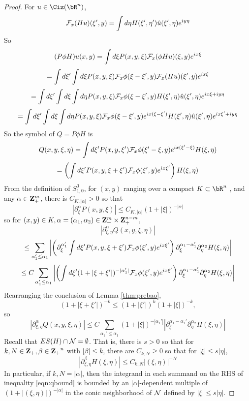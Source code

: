 \begin{proof}
  For $u \in \Ciz(\bR^n)$,
  \[
    {\cal F}_x(Hu)(\xi',y) = \int  d\eta H(\xi',\eta')\hat{u}(\xi',\eta)e^{ i y \eta}
  \]
  So
  \[
    (P\phi H)u(x,y) = \int d \xi P(x,y,\xi) {\cal F}_x(\phi Hu)(\xi,y)e^{i x\xi}
  \]
  \[
    =\int d \xi' \int d \xi P(x,y,\xi) {\cal F}_x\phi(\xi-\xi',y) {\cal F}_x(Hu)(\xi',y)e^{i x\xi}
  \]
  \[
   =\int d \xi' \int d \xi \int d\eta P(x,y,\xi) {\cal F}_x\phi(\xi-\xi',y) H(\xi',\eta)\hat{u}(\xi',\eta)e^{i x\xi + i y\eta }
  \]
  \[
    =\int d \xi' \int d \xi \int d\eta P(x,y,\xi) {\cal F}_x\phi(\xi-\xi',y) e^{ix(\xi-\xi')}H(\xi',\eta)\hat{u}(\xi',\eta)e^{i x\xi' + i y\eta }
  \]
  So the symbol of $Q = P \phi H$ is
  \[
    Q(x,y,\xi,\eta) = \int d\xi' P(x,y,\xi') {\cal F}_x\phi(\xi'-\xi,y) e^{i x(\xi'-\xi)}H(\xi,\eta)
  \]
  \[
    = \left(\int d\xi' P(x,y,\xi+\xi') {\cal F}_x\phi(\xi',y) e^{i x\xi'}\right) H(\xi,\eta)
  \]
  From the definition of $S^0_{1,0}$, for $(x,y)$ ranging over a compact $K \subset \bR^n$ , and any $\alpha \in {\bf Z}_+^m$, there is $C_{K,|\alpha|} > 0$ so that
  \[
    |\partial^{\alpha}_{\xi} P(x,y,\xi)| \le C_{K,|\alpha|}(1 + |\xi|)^{-|\alpha|}
  \]
  so for $(x,y) \in K, \alpha=(\alpha_1,\alpha_2) \in {\bf Z}_+^m \times {\bf Z}_+^{n-m}$,
  \[
    |\partial_{\xi,\eta}^{\alpha} Q(x,y,\xi,\eta)|
  \]
  \[
    \le \sum_{\alpha_1' \le \alpha_1} \left|\left(\partial_{\xi}^{\alpha_1'}  \int d\xi' P(x,y,\xi+\xi') {\cal F}_x\phi(\xi',y) e^{i x\xi'}\right)\partial_{\xi}^{\alpha_1-\alpha_1'} \partial_{\eta}^{\alpha_2}H(\xi,\eta)       \right|
  \]
  \[
    \le C \sum_{\alpha_1' \le \alpha_1} \left|\left(  \int d\xi' (1 + |\xi+\xi'|)^{-|\alpha_1'|} {\cal F}_x\phi(\xi',y) e^{i x\xi'}\right)\partial_{\xi}^{\alpha_1-\alpha_1'} \partial_{\eta}^{\alpha_2}H(\xi,\eta)       \right|
  \]
  Rearranging the conclusion of Lemma \ref{thm:prebao},
  \[
    (1 + |\xi + \xi'|)^{-k} \le (1+|\xi'|)^k(1+|\xi|)^{-k},
  \]
  so
  \begin{equation}
    \label{eqn:qbound}
    |\partial_{\xi,\eta}^{\alpha} Q(x,y,\xi,\eta)| \le C \sum_{\alpha_1' \le \alpha_1} (1 + |\xi|)^{-|\alpha_1'|}|\partial_{\xi}^{\alpha_1-\alpha_1'}\partial_{\eta}^{\alpha_2}H(\xi,\eta) |
  \end{equation}
  Recall that $ES(H) \cap {\cal N} = \emptyset$. That is, there is $s>0$ so that for
  $k,N \in {\bf Z}_+, \beta \in {\bf Z_+}^n$ with $|\beta| \le k$, there are $C_{k,N} \ge 0$ so that for $|\xi| \le s|\eta|$,
  \[
    |\partial_{\xi,\eta}^{\beta}H(\xi,\eta)| \le C_{k,N} |(\xi,\eta)|^{-N}
  \]
  In particular, if $k, N = |\alpha|$, then the integrand in each summand on the RHS of inequality \ref{eqn:qbound} is bounded by an $|\alpha|$-dependent multiple of $(1+|(\xi,\eta)|)^{-|\alpha|}$ in the conic neighborhood of ${\cal N}$ defined by $|\xi| \le s|\eta|$. 


\end{proof}
